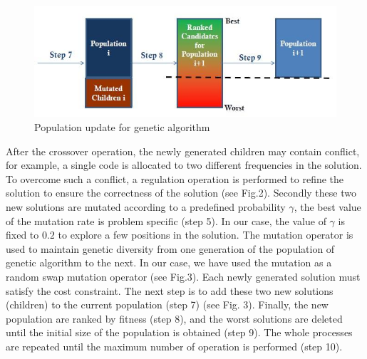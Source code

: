 \documentclass{singlecol-new}
\theoremstyle{TH}{
\newtheorem{lemma}{Lemma}
\newtheorem{theorem}[lemma]{Theorem}
\newtheorem{corrolary}[lemma]{Corrolary}
\newtheorem{conjecture}[lemma]{Conjecture}
\newtheorem{proposition}[lemma]{Proposition}
\newtheorem{claim}[lemma]{Claim}
\newtheorem{stheorem}[lemma]{Wrong Theorem}
}
\theoremstyle{THrm}{
\newtheorem{definition}{Definition}
\newtheorem{question}{Question}
\newtheorem{remark}{Remark}
\newtheorem{scheme}{Scheme}
}
\theoremstyle{THhit}{
\newtheorem{case}{Case}[section]
}
\begin{document}
\begin{figure}[h]
\caption{Population update for genetic algorithm}
\begin{center}
\includegraphics[scale=0.45]{Images/Drawing_1.jpg}

\end{center}
\label{Fig2}
\end{figure}




After the crossover operation, the newly generated children may contain conflict, for example, a single code is allocated to two different frequencies in the solution. To overcome such a conflict, a regulation operation is performed to refine the solution to ensure the correctness of the solution (see Fig.2).
 Secondly these two new solutions are mutated according to a predefined probability $\gamma$, the best value of the mutation rate is  problem specific (step 5). In our case, the value of $\gamma$ is fixed to $0.2$ to explore a few positions in the solution. The mutation operator is used to maintain genetic diversity from one generation of the population of genetic algorithm to the next. In our case, we have used the mutation as a random swap mutation operator (see Fig.3).  Each newly generated solution must satisfy the cost constraint. The next step is to add these two new solutions (children) to the current population (step 7) (see Fig. 3). Finally, the new population are ranked by fitness (step 8), and the worst solutions are deleted until the initial size of the population is obtained  (step 9). The whole processes are repeated until the maximum number of operation is performed (step 10). 
 
\end{document}
